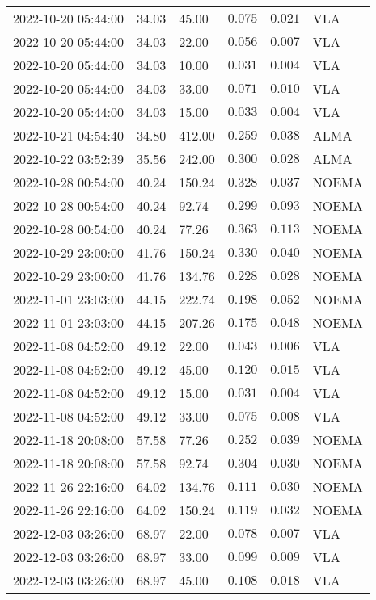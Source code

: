 \documentclass{nature_plusfigure}
\begin{document}
\begin{supplement}
\begin{center}
\begin{longtable}{llllll}
2022-10-20 05:44:00 & 34.03 & 45.00 & $0.075$ & $0.021$ & VLA \\ 
2022-10-20 05:44:00 & 34.03 & 22.00 & $0.056$ & $0.007$ & VLA \\ 
2022-10-20 05:44:00 & 34.03 & 10.00 & $0.031$ & $0.004$ & VLA \\ 
2022-10-20 05:44:00 & 34.03 & 33.00 & $0.071$ & $0.010$ & VLA \\ 
2022-10-20 05:44:00 & 34.03 & 15.00 & $0.033$ & $0.004$ & VLA \\ 
2022-10-21 04:54:40 & 34.80 & 412.00 & $0.259$ & $0.038$ & ALMA \\ 
2022-10-22 03:52:39 & 35.56 & 242.00 & $0.300$ & $0.028$ & ALMA \\ 
2022-10-28 00:54:00 & 40.24 & 150.24 & $0.328$ & $0.037$ & NOEMA \\ 
2022-10-28 00:54:00 & 40.24 & 92.74 & $0.299$ & $0.093$ & NOEMA \\ 
2022-10-28 00:54:00 & 40.24 & 77.26 & $0.363$ & $0.113$ & NOEMA \\ 
2022-10-29 23:00:00 & 41.76 & 150.24 & $0.330$ & $0.040$ & NOEMA \\ 
2022-10-29 23:00:00 & 41.76 & 134.76 & $0.228$ & $0.028$ & NOEMA \\ 
2022-11-01 23:03:00 & 44.15 & 222.74 & $0.198$ & $0.052$ & NOEMA \\ 
2022-11-01 23:03:00 & 44.15 & 207.26 & $0.175$ & $0.048$ & NOEMA \\ 
2022-11-08 04:52:00 & 49.12 & 22.00 & $0.043$ & $0.006$ & VLA \\ 
2022-11-08 04:52:00 & 49.12 & 45.00 & $0.120$ & $0.015$ & VLA \\ 
2022-11-08 04:52:00 & 49.12 & 15.00 & $0.031$ & $0.004$ & VLA \\ 
2022-11-08 04:52:00 & 49.12 & 33.00 & $0.075$ & $0.008$ & VLA \\ 
2022-11-18 20:08:00 & 57.58 & 77.26 & $0.252$ & $0.039$ & NOEMA \\ 
2022-11-18 20:08:00 & 57.58 & 92.74 & $0.304$ & $0.030$ & NOEMA \\ 
2022-11-26 22:16:00 & 64.02 & 134.76 & $0.111$ & $0.030$ & NOEMA \\ 
2022-11-26 22:16:00 & 64.02 & 150.24 & $0.119$ & $0.032$ & NOEMA \\ 
2022-12-03 03:26:00 & 68.97 & 22.00 & $0.078$ & $0.007$ & VLA \\ 
2022-12-03 03:26:00 & 68.97 & 33.00 & $0.099$ & $0.009$ & VLA \\ 
2022-12-03 03:26:00 & 68.97 & 45.00 & $0.108$ & $0.018$ & VLA \\ 

\end{longtable}
\end{center}
\end{supplement}
\end{document}
